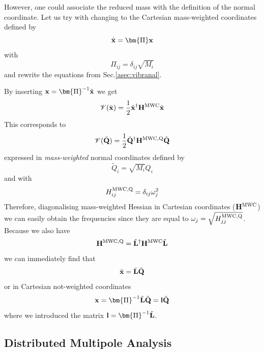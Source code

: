 \documentclass[a4paper,titlepage,twoside,fleqn,12pt]{book}
\newcommand{\BM}[1]{\bm{#1}}
\begin{document}
\begin{appendices}
However, one could 
associate the reduced mass with the definition of the normal coordinate.
Let us try with changing to the Cartesian mass\hyp{}weighted coordinates defined by
\begin{equation}
\tilde{\bf x} = {\BM \Pi}{\bf x} 
\end{equation}
with
\begin{equation}
\Pi_{ij} = \delta_{ij} \sqrt{M_i}
\end{equation}
and rewrite the equations from Sec.\ref{asec:vibranal}.

By inserting ${\bf x}={\BM \Pi}^{-1}\tilde{\bf x}$ we get
\begin{equation}
\mathscr{V}(\tilde{\bf x}) = \frac{1}{2} \tilde{\bf x}^{\dagger} {\bf H}^{\rm MWC}  \tilde{\bf x}
\end{equation}
This corresponds to 
\begin{equation}
\mathscr{V}(\tilde{\bf Q}) = \frac{1}{2} \tilde{\bf Q}^{\dagger} {\bf H}^{\rm MWC,Q}  \tilde{\bf Q}
\end{equation}
expressed in \emph{mass-weighted} normal coordinates defined by
\begin{equation}
\tilde{Q}_i = \sqrt{M_i} Q_i
\end{equation}
and with 
\begin{equation}
H_{ij}^{\rm MWC,Q} = \delta_{ij} \omega_j^2
\end{equation}
Therefore, diagonalising mass-weighted Hessian in Cartesian coordinates (${\bf H}^{\rm MWC}$)
we can easily obtain the frequencies since they are equal to $\omega_j=\sqrt{H_{jj}^{\rm MWC,Q}}$.
Because we also have
\begin{equation}
{\bf H}^{\rm MWC,Q} = \tilde{\bf L}^{\dagger} {\bf H}^{\rm MWC} \tilde{\bf L}
\end{equation}
we can immediately find that
\begin{equation}
\tilde{\bf x} = \tilde{\bf L} \tilde{\bf Q}
\end{equation}
or in Cartesian not-weighted coordinates
\begin{equation}
{\bf x} = {\BM \Pi}^{-1} \tilde{\bf L} \tilde{\bf Q} = {\bf l} \tilde{\bf Q}
\end{equation}
where we introduced the matrix ${\bf l}={\BM \Pi}^{-1} \tilde{\bf L}$.



\begin{refsection}
\chapter{Distributed Multipole Analysis\label{c:dma}}


\end{refsection}
\end{appendices}
\end{document}
